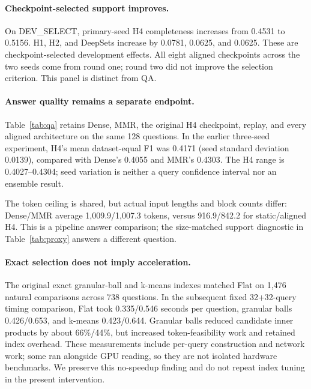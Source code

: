 \documentclass[runningheads]{llncs}
\begin{document}
\paragraph{Checkpoint-selected support improves.}
On DEV\_SELECT, primary-seed H4 completeness increases from 0.4531 to
0.5156. H1, H2, and DeepSets increase by 0.0781, 0.0625, and 0.0625.
These are checkpoint-selected development effects. All eight aligned
checkpoints across the two seeds come from round one; round two did not
improve the selection criterion. This panel is distinct from QA.

\paragraph{Answer quality remains a separate endpoint.}
Table~\ref{tab:qa} retains Dense, MMR, the original H4 checkpoint, replay,
and every aligned architecture on the same 128 questions. In the earlier
three-seed experiment, H4's mean dataset-equal F1 was 0.4171 (seed standard
deviation 0.0139), compared with Dense's 0.4055 and MMR's 0.4303.
The H4 range is 0.4027--0.4304; seed variation is neither a query confidence
interval nor an ensemble result.


The token ceiling is shared, but actual input lengths and block counts
differ: Dense/MMR average 1,009.9/1,007.3 tokens, versus 916.9/842.2 for
static/aligned H4. This is a pipeline answer comparison; the size-matched
support diagnostic in Table~\ref{tab:proxy} answers a different question.

\paragraph{Exact selection does not imply acceleration.}
The original exact granular-ball and k-means indexes matched Flat on 1,476
natural comparisons across 738 questions. In the subsequent fixed
32+32-query timing comparison, Flat took 0.335/0.546 seconds per question,
granular balls 0.426/0.653, and k-means 0.423/0.644. Granular balls reduced
candidate inner products by about 66\%/44\%, but increased token-feasibility
work and retained index overhead. These measurements include per-query
construction and network work; some ran alongside GPU reading, so they are
not isolated hardware benchmarks. We preserve this no-speedup finding and
do not repeat index tuning in the present intervention.

\end{document}
